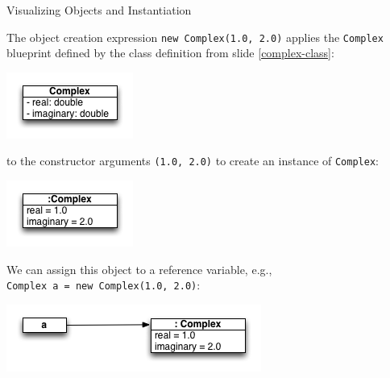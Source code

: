 \documentclass{beamer}
\begin{document}
\begin{frame}[fragile]{Visualizing Objects and Instantiation}

The object creation expression {\tt new Complex(1.0, 2.0)}
applies the {\tt Complex} blueprint defined by the class definition from slide \ref{complex-class}:
\vspace{-.1in}
\begin{center}
\includegraphics[height=.7in]{complex-class.png}
\end{center}
\vspace{-.125in}
to the constructor arguments {\tt (1.0, 2.0)} to create an instance of {\tt Complex}:
\vspace{-.125in}
\begin{center}
\includegraphics[height=.7in]{complex-instance.png}
\end{center}
\vspace{-.125in}
We can assign this object to a reference variable, e.g.,\\ {\tt Complex a = new Complex(1.0, 2.0)}:
\vspace{-.075in}
\begin{center}
\includegraphics[height=.7in]{complex-reference.png}
\end{center}

\end{frame}
\end{document}
